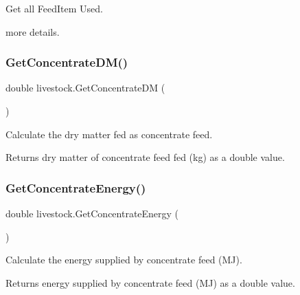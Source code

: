 Get all Feed\+Item Used. 

more details. \mbox{\label{classlivestock_aae3e79cb0aad2d69a5a1a2a97956f23b}} 
\subsubsection{\texorpdfstring{GetConcentrateDM()}{GetConcentrateDM()}}
{\footnotesize\ttfamily double livestock.\+Get\+Concentrate\+DM (\begin{DoxyParamCaption}{ }\end{DoxyParamCaption})\hspace{0.3cm}{\ttfamily [inline]}}



Calculate the dry matter fed as concentrate feed. 

\begin{DoxyReturn}{Returns}
dry matter of concentrate feed fed (kg) as a double value. 
\end{DoxyReturn}
\mbox{\label{classlivestock_aa8d54b87c79101f0633184a7929d5ab9}} 
\subsubsection{\texorpdfstring{GetConcentrateEnergy()}{GetConcentrateEnergy()}}
{\footnotesize\ttfamily double livestock.\+Get\+Concentrate\+Energy (\begin{DoxyParamCaption}{ }\end{DoxyParamCaption})\hspace{0.3cm}{\ttfamily [inline]}}



Calculate the energy supplied by concentrate feed (MJ). 

\begin{DoxyReturn}{Returns}
energy supplied by concentrate feed (MJ) as a double value. 
\end{DoxyReturn}
\mbox{\label{classlivestock_a4a18f5cfcedb2990257d0f50a0440bd8}} 
